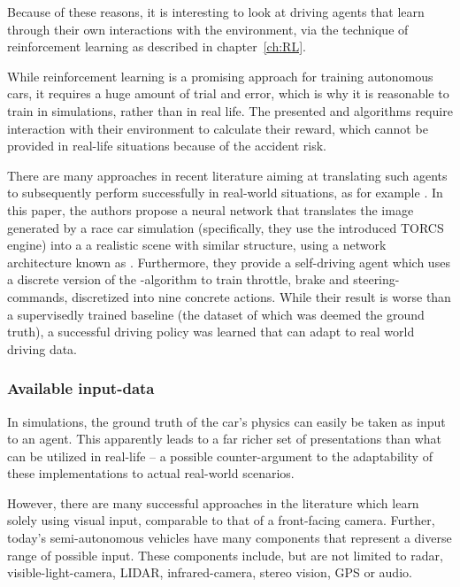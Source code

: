 Because of these reasons, it is interesting to look at driving agents that learn through their own interactions with the environment, via the technique of reinforcement learning as described in chapter~\ref{ch:RL}.

While reinforcement learning is a promising approach for training autonomous cars, it requires a huge amount of trial and error, which is why it is reasonable to train in simulations, rather than in real life. The presented  and  algorithms require interaction with their environment to calculate their reward, which cannot be provided in real-life situations because of the accident risk.

There are many approaches in recent literature aiming at translating such agents to subsequently perform successfully in real-world situations, as for example \cite{you_virtual_2017}. In this paper, the authors propose a neural network that translates the image generated by a race car simulation (specifically, they use the introduced TORCS engine) into a a realistic scene with similar structure, using a network architecture known as \cite{badrinarayanan_segnet:_2015}. 
Furthermore, they provide a self-driving agent which uses a discrete version of the  \cite{mnih_asynchronous_2016}-algorithm to train throttle, brake and steering-commands, discretized into nine concrete actions. While their result is worse than a supervisedly trained baseline (the dataset of which was deemed the ground truth), a successful driving policy was learned that can adapt to real world driving data.

\subsubsection{Available input-data}

In simulations, the ground truth of the car's physics can easily be taken as input to an agent. This apparently leads to a far richer set of presentations than what can be utilized in real-life -- a possible counter-argument to the adaptability of these implementations to actual real-world scenarios.

However, there are many successful approaches in the literature which learn solely using visual input, comparable to that of a front-facing camera. Further, today's semi-autonomous vehicles have many components that represent a diverse range of possible input. These components include, but are not limited to radar, visible-light-camera, LIDAR, infrared-camera, stereo vision, GPS or audio. 

